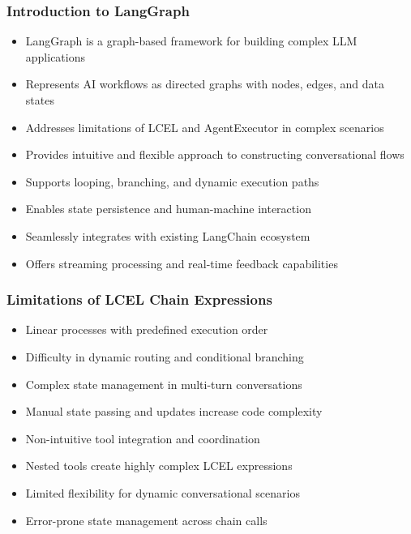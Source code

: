 \begin{frame}[fragile]\frametitle{Introduction to LangGraph}
      \begin{itemize}
        \item LangGraph is a graph-based framework for building complex LLM applications
        \item Represents AI workflows as directed graphs with nodes, edges, and data states
        \item Addresses limitations of LCEL and AgentExecutor in complex scenarios
        \item Provides intuitive and flexible approach to constructing conversational flows
        \item Supports looping, branching, and dynamic execution paths
        \item Enables state persistence and human-machine interaction
        \item Seamlessly integrates with existing LangChain ecosystem
        \item Offers streaming processing and real-time feedback capabilities
      \end{itemize}
\end{frame}

\begin{frame}[fragile]\frametitle{Limitations of LCEL Chain Expressions}
      \begin{itemize}
        \item Linear processes with predefined execution order
        \item Difficulty in dynamic routing and conditional branching
        \item Complex state management in multi-turn conversations
        \item Manual state passing and updates increase code complexity
        \item Non-intuitive tool integration and coordination
        \item Nested tools create highly complex LCEL expressions
        \item Limited flexibility for dynamic conversational scenarios
        \item Error-prone state management across chain calls
      \end{itemize}
\end{frame}

